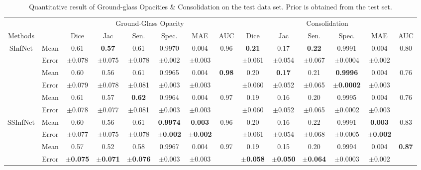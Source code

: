 \begin{table}[!h]
	\centering
	\small
	\begin{tabular}{| c | c || c c c c c | c || c c c c c | c |}
		\hline
		& &\multicolumn{6}{c||}{Ground-Glass Opacity} & \multicolumn{6}{c|}{Consolidation}\\ \cline{3-14}
		Methods & & Dice & Jac & Sen. & Spec. & MAE & AUC & Dice & Jac & Sen. & Spec. & MAE & AUC \\\hline
		SInfNet & Mean & 0.61 & \textbf{0.57} & 0.61 & 0.9970 & 0.004 & 0.96 & \textbf{0.21} & 0.17 & \textbf{0.22} & 0.9991 & 0.004 & 0.80 \\ \cline{2-14}
		& Error & $\pm$0.078 & $\pm$0.075 & $\pm$0.078 & $\pm$0.002 & $\pm$0.003 & & $\pm$0.061 & $\pm$0.054 & $\pm$0.067 & $\pm$0.0004 & $\pm$0.002 & \\ \hline \hline
		
		\vtop{\hbox{\strut SInfNet+}\hbox{\strut data aug(0.4)}} & Mean & 0.60 & 0.56 & 0.61 & 0.9965 & 0.004 & \textbf{0.98} & 0.20 & \textbf{0.17} & 0.21 & \textbf{0.9996} & 0.004 & 0.76 \\ \cline{2-14}
		& Error & $\pm$0.079 & $\pm$0.078 & $\pm$0.081 & $\pm$0.003 & $\pm$0.003 & & $\pm$0.060 & $\pm$0.052 & $\pm$0.065 & $\pm$\textbf{0.0002} & $\pm$0.003 &  \\ \hline \hline
		
		\vtop{\hbox{\strut SInfNet+}\hbox{\strut data aug(0.5)}} & Mean & 0.61 & 0.57 & \textbf{0.62} & 0.9964 & 0.004 & 0.97 & 0.19 & 0.16 & 0.20 & 0.9995 & 0.004 & 0.76 \\ \cline{2-14}
		& Error & $\pm$0.078 & $\pm$0.077 & $\pm$0.081 & $\pm$0.003 & $\pm$0.003 & & $\pm$0.060 & $\pm$0.052 & $\pm$0.065 & $\pm$0.0002 & $\pm$0.003 & \\ \hline \hline

		SSInfNet & Mean & 0.60 & 0.56 & 0.61 & \textbf{0.9974} & \textbf{0.003} & 0.96 & 0.20 & 0.16 & 0.22 & 0.9991 & \textbf{0.003} & 0.83 \\ \cline{2-14}
		& Error & $\pm$0.077 & $\pm$0.075 & $\pm$0.078 & $\pm$\textbf{0.002} & $\pm$\textbf{0.002} & & $\pm$0.061 & $\pm$0.054 &$\pm$0.068 & $\pm$0.0005 &$\pm$\textbf{0.002} &  \\ \hline \hline
		
		\vtop{\hbox{\strut SSInfNet+}\hbox{\strut data aug}}& Mean & 0.57 & 0.52 & 0.58 & 0.9967 & 0.004 & 0.97 & 0.19 & 0.15 & 0.20 & 0.9994 & 0.004 & \textbf{0.87} \\ \cline{2-14}
		& Error & $\pm$\textbf{0.075} & $\pm$\textbf{0.071} & $\pm$\textbf{0.076} & $\pm$0.003 & $\pm$0.003 & & $\pm$\textbf{0.058} & $\pm$\textbf{0.050} & $\pm$\textbf{0.064} & $\pm$0.0003 & $\pm$0.002 & \\ \hline \hline
	\end{tabular}
	\caption{Quantitative result of Ground-glass Opacities \& Consolidation on the test data set. Prior is obtained from the test set.}
	\label{tab:multi-strongprior}
\end{table}


